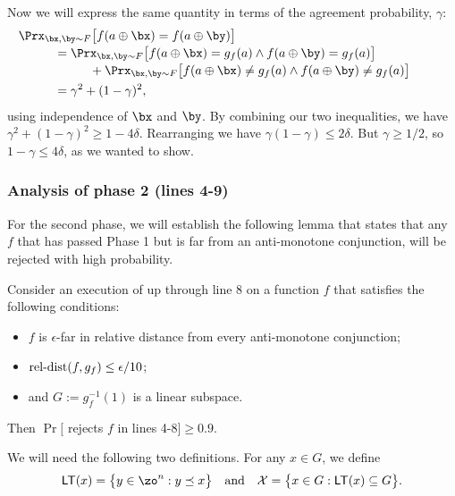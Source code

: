 \documentclass[11pt]{article}
\theoremstyle{definition}
\begin{document}
\begin{proofof}{}
Now we will express the same quantity in terms of the agreement probability, $\gamma$:
\begin{align*}
        &\hspace{-1cm}\Prx_{\bx, \by \sim F}\big[f(a \oplus \bx) = f(a \oplus \by)\big] \\[-0.5ex]
        &= \Prx_{\bx, \by \sim F}\big[f(a \oplus \bx)=g_f(a)  \land  f(a \oplus \by)=g_f(a)\big] \\[-0.5ex]
        &\hspace{1cm}+ \Prx_{\bx,\by \sim F}\big[f(a \oplus \bx) \neq g_f(a) \land  f(a \oplus \by) \neq g_f(a)\big] \\
        &= \gamma^2 + (1-\gamma)^2,
\end{align*}
using independence of $\bx$ and $\by$.
By combining our two inequalities,  we have 
$\gamma^2+(1-\gamma)^2 \geq 1 - 4 \delta$. Rearranging we have $\gamma(1-\gamma) \leq 2\delta$. But $\gamma \geq 1/2$, so $1 - \gamma \leq 4 \delta$, as we wanted to show.
\end{proofof}

    
\subsubsection{Analysis of phase 2 (lines 4-9)}


For the second phase, we will establish the following lemma that states that any $f$ that has passed Phase 1 but is far from an anti-monotone conjunction, will be rejected with high probability.


\begin{lemma}\label{lem: line 7-11}
    Consider an execution of   up through line 8 on a function $f$  that satisfies the following conditions:
    \begin{itemize}
        \item $f$ is $\epsilon$-far in relative distance from every {anti-monotone} conjunction;
        \item $\mathrm{rel}\text{-}\mathrm{dist}(f,g_f) \leq \epsilon/10$;
        \item and $G:=g_f^{-1}(1)$ is a linear subspace.
    \end{itemize}
Then $\Pr[$ rejects $f$ in lines 4-8$]\geq 0.9$.
\end{lemma}

\def\LT{\textsf{LT}}

We will need the following two definitions. For any $x \in G$, we define 
\begin{align*}
\LT(x) =\big\{ y \in \zo^n : y \preceq x \big\}\quad\text{and}\quad
\mathcal{X} =\big\{x \in G : \LT(x) \subseteq G\big\}.
\end{align*}
\end{document}
